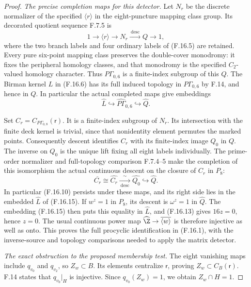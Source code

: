 \begin{proof}
\emph{The precise completion maps for this detector.}
Let $N_r$ be the discrete normalizer of
the specified $\langle r\rangle$ in the
eight-puncture mapping class group.
Its decorated quotient sequence F.7.5
is
\[
       1\longrightarrow\langle r\rangle
         \longrightarrow N_r
         \xrightarrow{\ \operatorname{desc}\ }Q
         \longrightarrow1 ,
                                                               \tag{F.16.14}
\]
where the two branch labels and four
ordinary labels of (F.16.5) are retained.
Every pure six-point mapping class
preserves the double-cover monodromy:
it fixes the peripheral homology classes,
and that monodromy is the specified
$C_2$-valued homology character.
Thus $P\Gamma_{0,6}$ is a finite-index
subgroup of this $Q$.
The Birman kernel $L$ in (F.16.6) has
its full induced topology in
$P\Gamma_{0,6}$ by F.14, and hence in
$Q$.  In particular the actual completed
maps give embeddings
\[
           \widehat L\hookrightarrow
             \widehat{P\Gamma}_{0,6}
                    \hookrightarrow\widehat Q .
                                                               \tag{F.16.15}
\]

Set $C_r=C_{P\Gamma_{0,8}}(\mathsf r)$.
It is a finite-index subgroup of $N_r$.
Its intersection with the finite deck
kernel is trivial, since that nonidentity
element permutes the marked points.
Consequently descent identifies $C_r$
with its finite-index image $Q_0$ in $Q$.
The inverse on $Q_0$ is the unique
lift fixing all eight labels individually.
The prime-order normalizer and full-topology
comparison F.7.4--5 make the completion
of this isomorphism the actual continuous
descent on the closure of $C_r$ in $P_8$:
\[
       \overline{C_r}\cong\widehat{C_r}
             \xrightarrow[\ \operatorname{desc}\ ]{\ \sim\ }
                           \widehat{Q_0}
               \hookrightarrow\widehat Q .
                                                               \tag{F.16.16}
\]
In particular (F.16.10) persists under
these maps, and its right side lies in
the embedded $\widehat L$ of (F.16.15).
If $w^z=1$ in $P_8$, its descent is
$\omega^z=1$ in $\widehat Q$.
The embedding (F.16.15) then puts this
equality in $\widehat L$, and
(F.16.13) gives $16z=0$, hence $z=0$.
The usual continuous power map
$\widehat\Z\to\overline{\langle w\rangle}$
is therefore injective as well as onto.
This proves the full procyclic
identification in (F.16.1), with the
inverse-source and topology comparisons
needed to apply the matrix detector.

\emph{The exact obstruction to the proposed membership test.}
The eight vanishing maps include
$q_{v_0}$ and $q_{v_2}$, so
$Z_w\subset B$.  Its elements centralize
$\mathsf r$, proving $Z_w\subset C_B(\mathsf r)$.
F.14 states that $q_{v_0}|_H$ is
injective.  Since $q_{v_0}(Z_w)=1$,
we obtain $Z_w\cap H=1$.


\end{proof}
